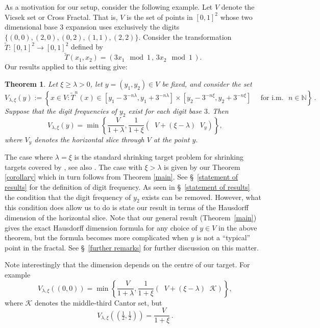 \documentclass[12pt]{article}
\newtheorem{theorem}[definition]{Theorem}
\theoremstyle{remark}
\numberwithin{equation}{section}
\renewcommand{\Bbb}[1]{\mathbb{#1}}
\newcommand{\N}{{\Bbb N}}         %
\newcommand{\cK}{{\mathcal K}}
\newcommand{\0}{\mathbf{0}}
\DeclareMathOperator{\dimh}{\dim_H}
\begin{document}
As a motivation for our setup, consider the following example. Let $V$ denote the Vicsek set or Cross Fractal. That is, {$V$ is} the set of points in $[0,1]^{2}$ whose two dimensional base $3$ expansion uses exclusively the digits $\{(0,0),(2,0),(0,2),(1,1),(2,2)\}$. Consider the transformation $\tilde{T}:[0,1]^{2}\to[0,1]^{2}$ defined by
\begin{equation*}
    \tilde{T}(x_{1},x_{2})=\left(3x_{1} \mod 1\,,\, 3x_{2} \mod 1\, \right).
\end{equation*}
Our results applied to this setting give:
\begin{theorem} \label{example result}
Let $\xi\geq \lambda>0$, {let} $y=(y_{1},y_{2})\in V$ be fixed, and consider the set 
\begin{equation*}
    V_{\lambda,\xi}(y):=\left\{x\in V : \tilde{T}^{n}(x) \in [y_{1}-3^{-n\lambda},y_{1}+3^{-n\lambda}]\times[y_{2}-3^{-n\xi},y_{2}+3^{-n\xi}] \quad \text{ for i.m. } \, \, n\in \N \right\}\, .
\end{equation*}
Suppose that the digit frequencies of $y_{2}$ exist for each digit base $3$. Then
\begin{equation*}
    \dimh {V}_{\lambda,\xi}(y) = \min \left\{ \frac{\dimh V}{1+\lambda}, \frac{1}{1+\xi}\left( \dimh V+ (\xi-\lambda)\dimh V_{y}\right)\right\},
\end{equation*}
where $V_{y}$ denotes the horizontal slice through $V$ at the point $y$.
\end{theorem}
The case where $\lambda=\xi$ is the standard shrinking target problem for shrinking targets covered by \cite{HillVelani95}, see also \cite{AllenBarany} . The case with $\xi>\lambda$ is given by our Theorem \ref{corollary} which in turn follows from Theorem \ref{main}.
See \S~\ref{statement of results} for the definition of digit frequency. As seen in \S~\ref{statement of results} the condition that the digit frequency of $y_{2}$ exists can be removed. However, what this condition does allow us to do is state our result in terms of the Hausdorff dimension of the horizontal slice. Note that our general result (Theorem~\ref{main}) gives the exact Hausdorff dimension formula for any choice of $y\in V$ in the above theorem, but the formula becomes more complicated when $y$ is not a ``typical'' point in the fractal. See \S~\ref{further remarks} for {further discussion on this matter}. \par 
Note interestingly that the dimension depends on the centre of our target. For example
\begin{equation*}
   \dimh V_{\lambda,\xi}((0,0)) = \min \left\{ \frac{\dimh V}{1+\lambda}, \frac{1}{1+\xi}\left( \dimh V + (\xi-\lambda)\dimh \cK\right)\right\}, 
\end{equation*}
where $\cK$ denotes the middle-third Cantor set, but
\begin{equation*}
    \dimh V_{\lambda,\xi}\left(\left(\tfrac{1}{2},\tfrac{1}{2}\right)\right) =  \frac{\dimh V}{1+\xi}\, .
\end{equation*}
\end{document}
